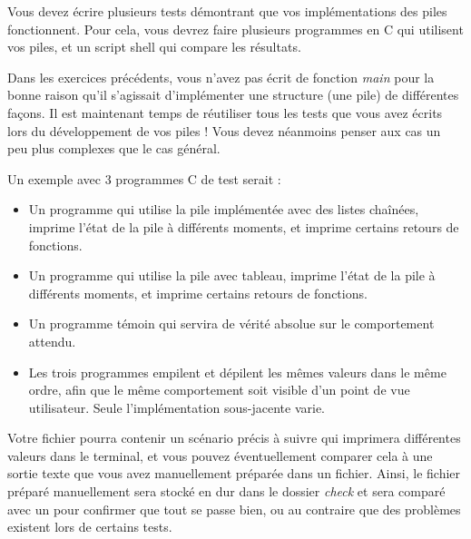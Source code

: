 

\vspace*{0.7cm}

\noindent {}

\bigskip

\noindent Vous devez écrire plusieurs tests démontrant que vos implémentations des piles fonctionnent.
Pour cela, vous devrez faire plusieurs programmes en C qui utilisent vos piles, et un script shell qui compare les résultats.

\noindent Dans les exercices précédents, vous n'avez pas écrit de fonction \textit{main} pour la bonne raison qu'il s'agissait d'implémenter une structure (une pile) de différentes façons.
Il est maintenant temps de réutiliser tous les tests que vous avez écrits lors du développement de vos piles !
Vous devez néanmoins penser aux cas un peu plus complexes que le cas général.

\bigskip

\noindent Un exemple avec 3 programmes C de test serait :
\begin{itemize}
\item Un programme qui utilise la pile implémentée avec des listes chaînées, imprime l'état de la pile à différents moments, et imprime certains retours de fonctions.
\item Un programme qui utilise la pile avec tableau, imprime l'état de la pile à différents moments, et imprime certains retours de fonctions.
\item Un programme témoin qui servira de vérité absolue sur le comportement attendu.
\item Les trois programmes empilent et dépilent les mêmes valeurs dans le même ordre, afin que le même comportement soit visible d'un point de vue utilisateur.
Seule l'implémentation sous-jacente varie.
\end{itemize}

\bigskip

\noindent Votre fichier  pourra contenir un scénario précis à suivre qui imprimera différentes valeurs dans le terminal, et vous pouvez éventuellement comparer cela à une sortie texte que vous avez manuellement préparée dans un fichier.
Ainsi, le fichier préparé manuellement sera stocké en dur dans le dossier \textit{check} et sera comparé avec un  pour confirmer que tout se passe bien, ou au contraire que des problèmes existent lors de certains tests.

